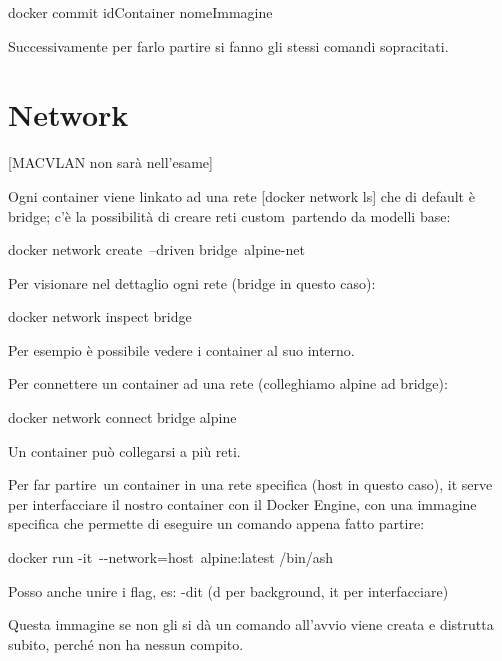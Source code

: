 \documentclass[
]{article}
\begin{document}
{}

{docker commit idContainer nomeImmagine}

{}

{Successivamente per farlo partire si fanno gli stessi comandi
sopracitati.}

\section{\texorpdfstring{{Network}}{Network}}\label{h.74xtvd7lb557}

{{[}MACVLAN non sarà nell'esame{]}}

{Ogni container viene linkato ad una rete {[}}{docker network ls}{{]}
che di default è }{bridge}{; c'è la possibilità di }{creare }{reti
custom}{~}{partendo da modelli base}{:}

{}

{docker network create}{~}{--driven bridge}{~}{alpine-net}

{}

{Per }{visionare }{nel dettaglio ogni rete (bridge in questo caso):}

{}

{docker network inspect bridge}

{Per esempio è possibile vedere i container al suo interno.}

{}

{Per }{connettere }{un container ad una rete (colleghiamo alpine ad
bridge):}

{}

{docker network connect bridge alpine}

{Un container può collegarsi a più reti.}

{}

{}

{Per }{far partire}{~un container in una rete specific}{a (host in
questo caso)}{, }{it serve per interfacciare il nostro container con il
Docker Engine}{, con una }{immagine specifica che permette di eseguire
un comando appena fatto partire}{:}

{}

{docker run }{-it}{~-\/-network=host}{~}{alpine:latest /bin/ash}

{Posso anche unire i flag, es: -dit (d per background, it per
interfacciare)}

{Questa immagine se non gli si dà un comando all'avvio viene creata e
distrutta subito, perché non ha nessun compito.}

{}

{}
\end{document}

